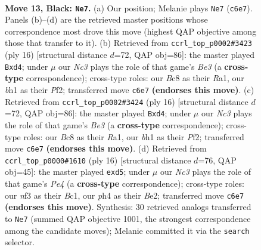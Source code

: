 \documentclass[11pt]{article}
\begin{document}
\clearpage

\begin{figure}[p]\centering
\begin{subfigure}{0.46\textwidth}\centering
\resizebox{\linewidth}{!}{%
\newchessgame
\chessboard[
  setfen={r1bq1rk1/pp4bp/2n3p1/2pPpp1n/7P/4PNP1/PP1P1P2/RNBQRK1B b - - 0 13},
  showmover=false,
  pgfstyle=straightmove, color=movearrow, markmove={c6-e7}
]}
\caption{}
\end{subfigure}\hfill
\begin{subfigure}{0.46\textwidth}\centering
\resizebox{\linewidth}{!}{%
\newchessgame
\chessboard[
  setfen={rnbq1rk1/pp3pbp/2pp1np1/8/2PpP3/2N1BN2/PP2BPPP/R2Q1RK1 w - - 0 9},
  showmover=false,
  pgfstyle=straightmove, color=movearrow, markmove={e3-d4}
]}
\caption{}
\end{subfigure}
\\[4pt]
\begin{subfigure}{0.46\textwidth}\centering
\resizebox{\linewidth}{!}{%
\newchessgame
\chessboard[
  setfen={rnbq1rk1/pp3pbp/2pp1np1/8/2PpP3/2N1BN2/PP2BPPP/R2Q1RK1 w - - 0 9},
  showmover=false,
  pgfstyle=straightmove, color=movearrow, markmove={e3-d4}
]}
\caption{}
\end{subfigure}\hfill
\begin{subfigure}{0.46\textwidth}\centering
\resizebox{\linewidth}{!}{%
\newchessgame
\chessboard[
  setfen={rnbq1rk1/pp3pbp/3p1np1/2pp4/2P1P3/2N2N2/PP2BPPP/R1BQ1RK1 w - - 0 9},
  showmover=false,
  pgfstyle=straightmove, color=movearrow, markmove={e4-d5}
]}
\caption{}
\end{subfigure}
\caption{\textbf{Move 13, Black: \texttt{Ne7}.} (a) Our position; Melanie plays \texttt{Ne7} (\texttt{c6e7}). Panels (b)--(d) are the retrieved master positions whose correspondence most drove this move (highest QAP objective among those that transfer to it). (b) Retrieved from \texttt{ccrl\_top\_p0002\#3423} (ply 16) [structural distance $d$=72, QAP obj=86]: the master played \texttt{Bxd4}; under $\mu$ our \emph{Nc3} plays the role of that game's \emph{Be3} (a \textbf{cross-type} correspondence); cross-type roles: our \emph{B}c8 as their \emph{R}a1, our \emph{b}h1 as their \emph{P}f2; transferred move \texttt{c6e7} \textbf{(endorses this move)}. (c) Retrieved from \texttt{ccrl\_top\_p0002\#3424} (ply 16) [structural distance $d$=72, QAP obj=86]: the master played \texttt{Bxd4}; under $\mu$ our \emph{Nc3} plays the role of that game's \emph{Be3} (a \textbf{cross-type} correspondence); cross-type roles: our \emph{B}c8 as their \emph{R}a1, our \emph{b}h1 as their \emph{P}f2; transferred move \texttt{c6e7} \textbf{(endorses this move)}. (d) Retrieved from \texttt{ccrl\_top\_p0000\#1610} (ply 16) [structural distance $d$=76, QAP obj=45]: the master played \texttt{exd5}; under $\mu$ our \emph{Nc3} plays the role of that game's \emph{Pe4} (a \textbf{cross-type} correspondence); cross-type roles: our \emph{n}f3 as their \emph{B}c1, our \emph{p}h4 as their \emph{B}e2; transferred move \texttt{c6e7} \textbf{(endorses this move)}. Synthesis: 30 retrieved analogs transferred to \texttt{Ne7} (summed QAP objective 1001, the strongest correspondence among the candidate moves); Melanie committed it via the \texttt{search} selector.}

\end{figure}
\end{document}

